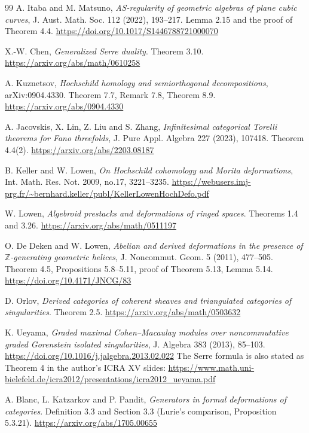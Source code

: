 \documentclass[a4paper,11pt]{ltjsarticle}
\theoremstyle{definition}
\begin{document}
\begin{thebibliography}{99}
A. Itaba and M. Matsuno,
\emph{AS-regularity of geometric algebras of plane cubic curves},
J. Aust. Math. Soc. 112 (2022), 193--217.
Lemma 2.15 and the proof of Theorem 4.4.
\url{https://doi.org/10.1017/S1446788721000070}

X.-W. Chen,
\emph{Generalized Serre duality}.
Theorem 3.10.
\url{https://arxiv.org/abs/math/0610258}

A. Kuznetsov,
\emph{Hochschild homology and semiorthogonal decompositions},
arXiv:0904.4330.
Theorem 7.7, Remark 7.8, Theorem 8.9.
\url{https://arxiv.org/abs/0904.4330}

A. Jacovskis, X. Lin, Z. Liu and S. Zhang,
\emph{Infinitesimal categorical Torelli theorems for Fano threefolds},
J. Pure Appl. Algebra 227 (2023), 107418.
Theorem 4.4(2).
\url{https://arxiv.org/abs/2203.08187}

B. Keller and W. Lowen,
\emph{On Hochschild cohomology and Morita deformations},
Int. Math. Res. Not. 2009, no.17, 3221--3235.
\url{https://webusers.imj-prg.fr/~bernhard.keller/publ/KellerLowenHochDefo.pdf}

W. Lowen,
\emph{Algebroid prestacks and deformations of ringed spaces}.
Theorems 1.4 and 3.26.
\url{https://arxiv.org/abs/math/0511197}

O. De Deken and W. Lowen,
\emph{Abelian and derived deformations in the presence of
$\mathbb Z$-generating geometric helices},
J. Noncommut. Geom. 5 (2011), 477--505.
Theorem 4.5, Propositions 5.8--5.11, proof of Theorem 5.13, Lemma 5.14.
\url{https://doi.org/10.4171/JNCG/83}

D. Orlov,
\emph{Derived categories of coherent sheaves and triangulated categories of singularities}.
Theorem 2.5.
\url{https://arxiv.org/abs/math/0503632}

K. Ueyama,
\emph{Graded maximal Cohen--Macaulay modules over noncommutative graded
Gorenstein isolated singularities},
J. Algebra 383 (2013), 85--103.
\url{https://doi.org/10.1016/j.jalgebra.2013.02.022}
The Serre formula is also stated as Theorem 4 in the author's ICRA XV slides:
\url{https://www.math.uni-bielefeld.de/icra2012/presentations/icra2012_ueyama.pdf}

A. Blanc, L. Katzarkov and P. Pandit,
\emph{Generators in formal deformations of categories}.
Definition 3.3 and Section 3.3 (Lurie's comparison, Proposition 5.3.21).
\url{https://arxiv.org/abs/1705.00655}


\end{thebibliography}
\end{document}
